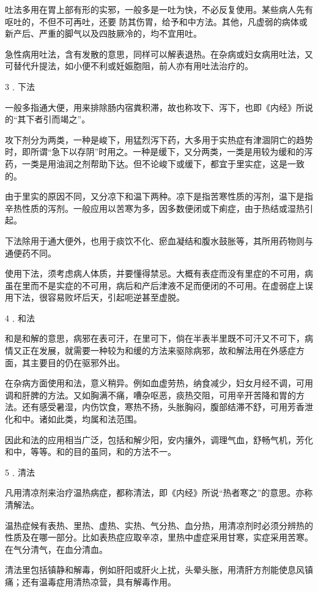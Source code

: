 \documentclass[a4paper,12pt,UTF8,twoside]{ctexbook}
\begin{document}
吐法多用在胃上部有形的实邪，一般多是一吐为快，不必反复使用。某些病人先有呕吐的，不但不可再吐，还要
防其伤胃，给予和中方法。其他，凡虚弱的病体或新产后、严重的脚气以及四肢厥冷的，均不宜用吐。

急性病用吐法，含有发散的意思，同样可以解表退热。在杂病或妇女病用吐法，又可替代升提法，如小便不利或妊娠胞阻，前人亦有用吐法治疗的。

3﹒下法

一般多指通大便，用来排除肠内宿粪积滞，故也称攻下、泻下，也即《内经》所说的“其下者引而竭之”。

攻下剂分为两类，一种是峻下，用猛烈泻下药，大多用于实热症有津涸阴亡的趋势时，即所谓“急下以存阴”时用之。一种是缓下，又分两类，一类是用较为缓和的泻药，一类是用油润之剂帮助下达。但不论峻下或缓下，都宜于里实症，这是一致的。

由于里实的原因不同，又分凉下和温下两种。凉下是指苦寒性质的泻剂，温下是指辛热性质的泻剂。一般应用以苦寒为多，因多数便闭或下痢症，由于热结或湿热引起。

下法除用于通大便外，也用于痰饮不化、瘀血凝结和腹水鼓胀等，其所用药物则与通便药不同。

使用下法，须考虑病人体质，并要懂得禁忌。大概有表症而没有里症的不可用，病虽在里而不是实症的不可用，病后和产后津液不足而便闭的不可用。在虚弱症上误用下法，很容易败坏后天，引起呃逆甚至虚脱。

4﹒和法

和是和解的意思，病邪在表可汗，在里可下，倘在半表半里既不可汗又不可下，病情又正在发展，就需要一种较为和缓的方法来驱除病邪，故和解法用在外感症方面，其主要目的仍在驱邪外出。

在杂病方面使用和法，意义稍异。例如血虚劳热，纳食减少，妇女月经不调，可用调和肝脾的方法。又如胸满不痛，嘈杂呕恶，痰热交阻，可用辛开苦降和胃的方法。还有感受暑湿，内伤饮食，寒热不扬，头胀胸闷，腹部结滞不舒，可用芳香泄化和中。诸如此类，均属和法范围。

因此和法的应用相当广泛，包括和解少阳，安内攘外，调理气血，舒畅气机，芳化和中，等等。和的目的虽同，和的方法不一。

5﹒清法

凡用清凉剂来治疗温热病症，都称清法，即《内经》所说“热者寒之”的意思。亦称清解法。

温热症候有表热、里热、虚热、实热、气分热、血分热，用清凉剂时必须分辨热的性质及在哪一部分。比如表热症应取辛凉，里热中虚症采用甘寒，实症采用苦寒。在气分清气，在血分清血。

清法里包括镇静和解毒，例如肝阳或肝火上扰，头晕头胀，用清肝方剂能使息风镇痛；还有温毒症用清热凉营，具有解毒作用。
\end{document}
